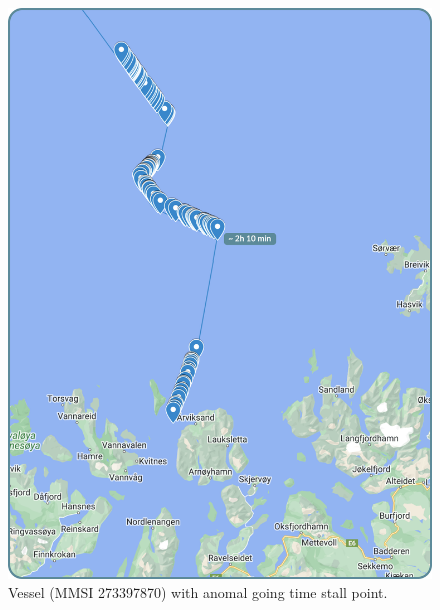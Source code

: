 \begin{figure}[H]
    \centering
    \includegraphics[width=12cm]{Images/3/anomaly-3.png}
    \caption{Vessel (MMSI 273397870) with anomal going time stall point.}
\end{figure}
